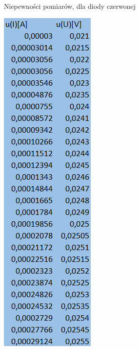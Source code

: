 \documentclass{article}
\begin{document}
\begin{figure}[b!]
\begin{subfigure}[b]{0.2\textwidth}
     \caption{Niepewności pomiarów, dla diody czerwonej}
  \end{subfigure}
  \begin{subfigure}[b]{0.2\textwidth}
    \includegraphics[width=\linewidth]{Niepewnosci_Dioda_Niebieskia.png}

\end{subfigure}
\end{figure}
\end{document}
